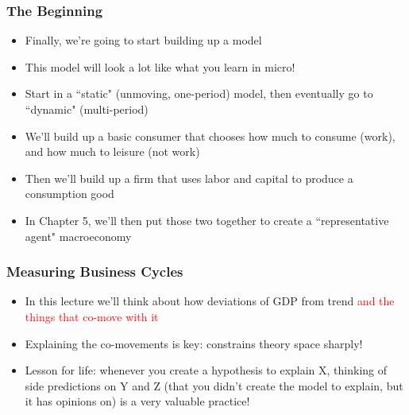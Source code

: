 \documentclass{beamer}
\author{Trevor S. Gallen}
\date{}
\begin{document}
\renewcommand*{\inserttotalframenumber}{\pageref{lastframe}}



\begin{frame}
\titlepage
\end{frame}

\begin{frame}
\frametitle[alignment=center]{The Beginning}
\begin{itemize}
\item Finally, we're going to start building up a model
\bigskip
\item This model will look a lot like what you learn in micro!  
\bigskip
\item Start in a ``static" (unmoving, one-period) model, then eventually go to ``dynamic" (multi-period)
\bigskip
\item We'll build up a basic consumer that chooses how much to consume (work), and how much to leisure (not work)
\bigskip
\item Then we'll build up a firm that uses labor and capital to produce a consumption good
\bigskip
\item In Chapter 5, we'll then put those two together to create a ``representative agent" macroeconomy
\end{itemize}
\end{frame}


\begin{frame}
\frametitle[alignment=center]{Measuring Business Cycles}
\begin{itemize}
\item In this lecture we'll think about how deviations of GDP from trend \textcolor{red}{and the things that co-move with it}
\bigskip
\item Explaining the co-movements is key: constrains theory space sharply!
\bigskip
\item Lesson for life:  whenever you create a hypothesis to explain X, thinking of side predictions on Y and Z (that you didn't create the model to explain, but it has opinions on) is a very valuable practice!
\end{itemize}
\end{frame}
\end{document}
